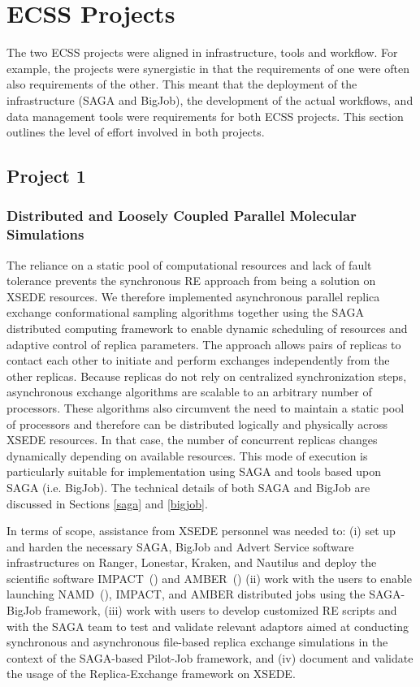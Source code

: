 \documentclass{sig-alternate}
\begin{document}
\section{ECSS Projects}

The two ECSS projects were aligned in infrastructure, tools and
workflow.  For example, the projects were synergistic in that
the requirements of one were often also requirements of the
other. This meant that the deployment of the infrastructure (SAGA and BigJob), 
the development of the actual workflows, and data management tools were
requirements for both ECSS projects. This section outlines the
level of effort involved in both projects.

\subsection{Project 1}
\subsubsection*{Distributed and Loosely Coupled Parallel Molecular Simulations}
The reliance on a static pool of computational resources and lack of
fault tolerance prevents the synchronous RE approach from being a
solution on XSEDE resources. We therefore implemented asynchronous
parallel replica exchange conformational sampling algorithms together
using the SAGA distributed computing framework to enable dynamic
scheduling of resources and adaptive control of replica
parameters. The approach allows pairs of replicas to contact
each other to initiate and perform exchanges independently from the
other replicas. Because replicas do not rely on centralized
synchronization steps, asynchronous exchange algorithms are scalable to an
arbitrary number of processors. These algorithms also circumvent
the need to maintain a static pool of processors and therefore
can be distributed logically and physically across XSEDE resources.
In that case, the number of concurrent replicas changes dynamically
depending on available resources. This mode of execution is particularly
suitable for implementation using SAGA and tools based upon SAGA (i.e. BigJob). The technical details of both SAGA and BigJob are discussed in Sections \ref{saga} and \ref{bigjob}.

In terms of scope, assistance from XSEDE personnel was needed to: (i) set up and
harden the necessary SAGA, BigJob and Advert Service software infrastructures on
Ranger, Lonestar, Kraken, and Nautilus and deploy the scientific software
IMPACT~(\cite{IMPACT}) and AMBER~(\cite{AMBER}) (ii) work with the
users to enable launching NAMD~(\cite{NAMD}), 
IMPACT, and AMBER distributed jobs using the
SAGA-BigJob framework, (iii) work with users to develop customized RE scripts
and with the SAGA team to test and validate relevant adaptors aimed at
conducting synchronous and asynchronous file-based replica exchange simulations
in the context of the SAGA-based Pilot-Job framework, and (iv)  document and
validate the usage of the Replica-Exchange framework on XSEDE.
\end{document}
